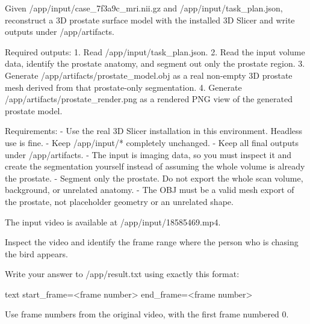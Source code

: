 \begin{instructionbox}
Given \textasciigrave{}/app/input/case\_7f3a9c\_mri.nii.gz\textasciigrave{} and \textasciigrave{}/app/input/task\_plan.json\textasciigrave{}, reconstruct a 3D prostate surface model with the installed 3D Slicer and write outputs under \textasciigrave{}/app/artifacts\textasciigrave{}.

Required outputs:
1. Read \textasciigrave{}/app/input/task\_plan.json\textasciigrave{}.
2. Read the input volume data, identify the prostate anatomy, and segment out only the prostate region.
3. Generate \textasciigrave{}/app/artifacts/prostate\_model.obj\textasciigrave{} as a real non-empty 3D prostate mesh derived from that prostate-only segmentation.
4. Generate \textasciigrave{}/app/artifacts/prostate\_render.png\textasciigrave{} as a rendered PNG view of the generated prostate model.

Requirements:
- Use the real 3D Slicer installation in this environment. Headless use is fine.
- Keep \textasciigrave{}/app/input/*\textasciigrave{} completely unchanged.
- Keep all final outputs under \textasciigrave{}/app/artifacts\textasciigrave{}.
- The input is imaging data, so you must inspect it and create the segmentation yourself instead of assuming the whole volume is already the prostate.
- Segment only the prostate. Do not export the whole scan volume, background, or unrelated anatomy.
- The OBJ must be a valid mesh export of the prostate, not placeholder geometry or an unrelated shape.
\end{instructionbox}

\begin{instructionbox}
The input video is available at \textasciigrave{}/app/input/18585469.mp4\textasciigrave{}.

Inspect the video and identify the frame range where the person who is chasing the bird appears.

Write your answer to \textasciigrave{}/app/result.txt\textasciigrave{} using exactly this format:

\textasciigrave{}\textasciigrave{}\textasciigrave{}text
start\_frame=\textless{}frame number\textgreater{}
end\_frame=\textless{}frame number\textgreater{}
\textasciigrave{}\textasciigrave{}\textasciigrave{}

Use frame numbers from the original video, with the first frame numbered \textasciigrave{}0\textasciigrave{}.
\end{instructionbox}

